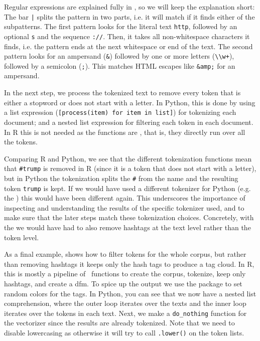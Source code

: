 Regular expressions are explained fully in , so we will keep the explanation short:
The bar \verb#|# splits the pattern in two parts, i.e. it will match if it finds either of the subpatterns.
The first pattern looks for the literal text \verb#http#, followed by an optional \verb#s# and the sequence \verb#://#.
Then, it takes all non-whitespace characters it finds, i.e. the pattern ends at the next whitespace or end of the text.
The second pattern looks for an ampersand (\verb#&#) followed by one or more letters (\verb#\\w+#), followed by a semicolon (\verb#;#).
This matches HTML escapes like \verb#&amp;# for an ampersand.

In the next step, we process the tokenized text to remove every token that is either a stopword or does not start with a letter. 
In Python, this is done by using a list expression (\verb#[process(item) for item in list]#) for tokenizing each document; and a nested list expression for filtering each token in each document.
In R this is not needed as the  functions are , that is, they directly run over all the tokens.

Comparing R and Python, we see that the different tokenization functions mean that \verb|#trump| is removed in R (since it is a token that does not start with a letter),
but in Python the tokenization splits the \verb|#| from the name and the resulting token \verb|trump| is kept.
If we would have used a different tokenizer for Python (e.g. the ) this would have been different again. 
This underscores the importance of inspecting and understanding the results of the specific tokenizer used,
and to make sure that the later steps match these tokenization choices.
Concretely, with the  we would have had to also remove hashtags at the text level rather than the token level. 


As a final example,  shows how to filter tokens for the whole corpus, but rather than removing hashtags it keeps only the hash tags to produce a tag cloud. 
In R, this is mostly a pipeline of \quanteda\ functions to create the corpus, tokenize, keep only hashtags, and create a dfm.
To spice up the output we use the  package to set random colors for the tags.
In Python, you can see that we now have a nested list comprehension, where the outer loop iterates over the texts and the inner loop iterates over the tokens in each text.
Next, we make a \verb|do_nothing| function for the vectorizer since the results are already tokenized.
Note that we need to disable lowercasing as otherwise it will try to call \verb|.lower()| on the token lists. 



